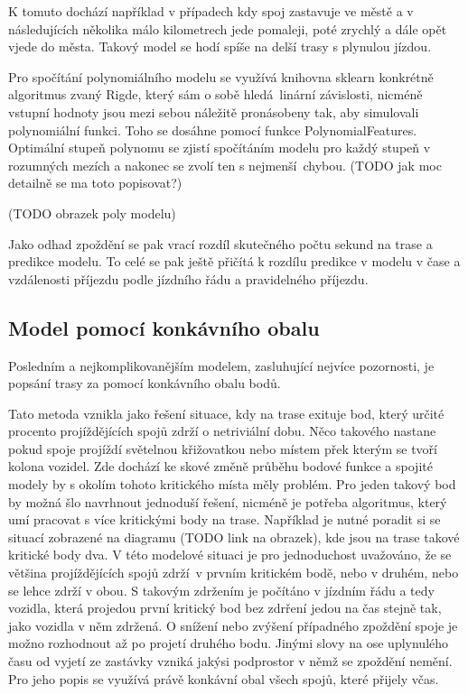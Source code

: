 K tomuto dochází například v případech kdy spoj zastavuje ve městě a v následujících několika málo kilometrech jede pomaleji, poté zrychlý a dále opět vjede do města. Takový model se hodí spíše na delší trasy s plynulou jízdou.

\bigbreak

Pro spočítání polynomiálního modelu se využívá knihovna sklearn konkrétně algoritmus zvaný Rigde, který sám o sobě hledá linární závislosti, nicméně vstupní hodnoty jsou mezi sebou náležitě pronásobeny tak, aby simulovali polynomiální funkci. Toho se dosáhne pomocí funkce PolynomialFeatures. Optimální stupeň polynomu se zjistí spočítáním modelu pro každý stupeň v rozumných mezích a nakonec se zvolí ten s nejmenší chybou. (TODO jak moc detailně se ma toto popisovat?)

(TODO obrazek poly modelu)

\bigbreak

Jako odhad zpoždění se pak vrací rozdíl skutečného počtu sekund na trase a predikce modelu. To celé se pak ještě přičítá k rozdílu predikce v modelu v čase a vzdálenosti příjezdu podle jízdního řádu a pravidelného příjezdu.


\subsection{Model pomocí konkávního obalu}

Posledním a nejkomplikovanějším modelem, zasluhující nejvíce pozornosti, je popsání trasy za pomocí konkávního obalu bodů.

\bigbreak

Tato metoda vznikla jako řešení situace, kdy na trase exituje bod, který určité procento projíždějících spojů zdrží o netriviální dobu. Něco takového nastane pokud spoje projíždí světelnou křižovatkou nebo místem přek kterým se tvoří kolona vozidel. Zde dochází ke skové změně průběhu bodové funkce a spojité modely by s okolím tohoto kritického místa měly problém. Pro jeden takový bod by možná šlo navrhnout jednoduší řešení, nicméně je potřeba algoritmus, který umí pracovat s více kritickými body na trase. Například je nutné poradit si se situací zobrazené na diagramu (TODO link na obrazek), kde jsou na trase takové kritické body dva. V této modelové situaci je pro jednoduchost uvažováno, že se většina projíždějících spojů zdrží v prvním kritickém bodě, nebo v druhém, nebo se lehce zdrží v obou. S takovým zdržením je počítáno v jízdním řádu a tedy vozidla, která projedou první kritický bod bez zdrření jedou na čas stejně tak, jako vozidla v něm zdržená. O snížení nebo zvýšení případného zpoždění spoje je možno rozhodnout až po projetí druhého bodu. Jinými slovy na ose uplynulého času od vyjetí ze zastávky vzniká jakýsi podprostor v němž se zpoždění nemění. Pro jeho popis se využívá právě konkávní obal všech spojů, které přijely včas.



